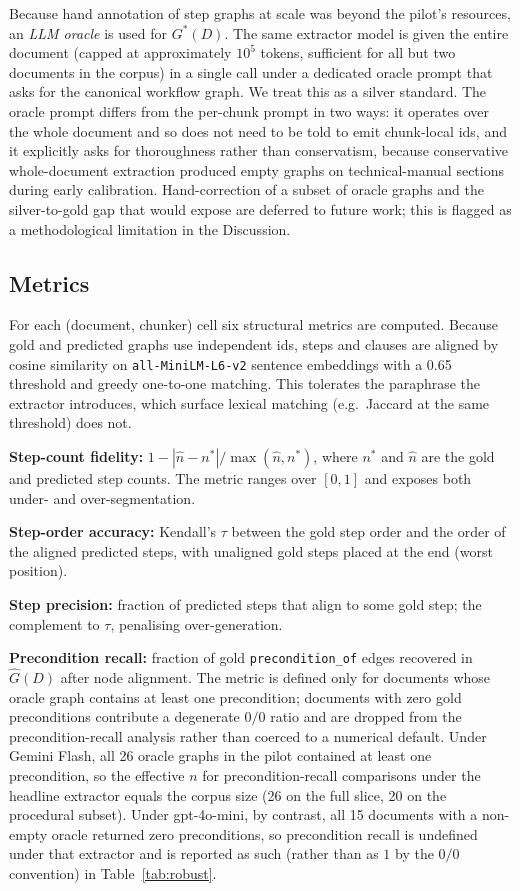 \documentclass[fleqn,10pt]{wlscirep}
\begin{document}
Because hand annotation of step graphs at scale was beyond the pilot's
resources, an \emph{LLM oracle} is used for $G^{*}(D)$. The same
extractor model is given the entire document (capped at approximately
$10^5$ tokens, sufficient for all but two documents in the corpus) in
a single call under a dedicated oracle prompt that asks for the
canonical workflow graph. We treat this as a silver standard. The
oracle prompt differs from the per-chunk prompt in two ways:
it operates over the whole document and so does not need to be told to
emit chunk-local ids, and it explicitly asks for thoroughness rather
than conservatism, because conservative whole-document extraction
produced empty graphs on technical-manual sections during early
calibration. Hand-correction of a subset of oracle graphs and the
silver-to-gold gap that would expose are deferred to future work; this
is flagged as a methodological limitation in the Discussion.

\subsection*{Metrics}

For each (document, chunker) cell six structural metrics are
computed. Because gold and predicted graphs use independent ids,
steps and clauses are aligned by cosine similarity on
\texttt{all-MiniLM-L6-v2} sentence embeddings with a 0.65 threshold
and greedy one-to-one matching. This
tolerates the paraphrase the extractor introduces, which surface
lexical matching (e.g.\ Jaccard at the same threshold) does not.

\textbf{Step-count fidelity:}
$1-|\hat{n}-n^{*}|/\max(\hat{n},n^{*})$, where $n^{*}$ and $\hat{n}$ are
the gold and predicted step counts. The metric ranges over $[0,1]$ and
exposes both under- and over-segmentation.

\textbf{Step-order accuracy:} Kendall's $\tau$ between the gold step
order and the order of the aligned predicted steps, with unaligned
gold steps placed at the end (worst position).

\textbf{Step precision:} fraction of predicted steps that align to
some gold step; the complement to $\tau$, penalising over-generation.

\textbf{Precondition recall:} fraction of gold
\texttt{precondition\_of} edges recovered in $\hat{G}(D)$ after node
alignment. The metric is defined only for documents whose oracle graph
contains at least one precondition; documents with zero gold
preconditions contribute a degenerate $0/0$ ratio and are dropped from
the precondition-recall analysis rather than coerced to a numerical
default. Under Gemini Flash, all 26 oracle graphs in the pilot
contained at least one precondition, so the effective $n$ for
precondition-recall comparisons under the headline extractor equals
the corpus size (26 on the full slice, 20 on the procedural subset).
Under gpt-4o-mini, by contrast, all 15 documents with a non-empty
oracle returned zero preconditions, so precondition recall is
undefined under that extractor and is reported as such (rather than as
$1$ by the $0/0$ convention) in Table~\ref{tab:robust}.
\end{document}
